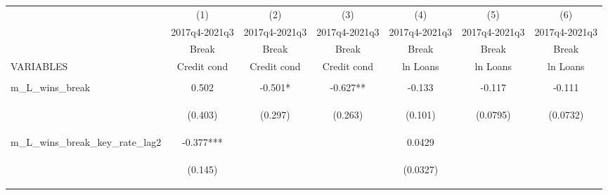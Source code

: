 



\begin{tabular}{lcccccc} \hline
 & (1) & (2) & (3) & (4) & (5) & (6) \\
 & 2017q4-2021q3 & 2017q4-2021q3 & 2017q4-2021q3 & 2017q4-2021q3 & 2017q4-2021q3 & 2017q4-2021q3 \\
 & Break & Break & Break & Break & Break & Break \\
VARIABLES & Credit cond & Credit cond & Credit cond & ln Loans & ln Loans & ln Loans \\ \hline
\vspace{4pt} & \begin{footnotesize}\end{footnotesize} & \begin{footnotesize}\end{footnotesize} & \begin{footnotesize}\end{footnotesize} & \begin{footnotesize}\end{footnotesize} & \begin{footnotesize}\end{footnotesize} & \begin{footnotesize}\end{footnotesize} \\
m\_L\_wins\_break & 0.502 & -0.501* & -0.627** & -0.133 & -0.117 & -0.111 \\
\vspace{4pt} & \begin{footnotesize}(0.403)\end{footnotesize} & \begin{footnotesize}(0.297)\end{footnotesize} & \begin{footnotesize}(0.263)\end{footnotesize} & \begin{footnotesize}(0.101)\end{footnotesize} & \begin{footnotesize}(0.0795)\end{footnotesize} & \begin{footnotesize}(0.0732)\end{footnotesize} \\
m\_L\_wins\_break\_key\_rate\_lag2 & -0.377*** &  &  & 0.0429 &  &  \\
\vspace{4pt} & \begin{footnotesize}(0.145)\end{footnotesize} & \begin{footnotesize}\end{footnotesize} & \begin{footnotesize}\end{footnotesize} & \begin{footnotesize}(0.0327)\end{footnotesize} & \begin{footnotesize}\end{footnotesize} & \begin{footnotesize}\end{footnotesize} \\

\end{tabular}
